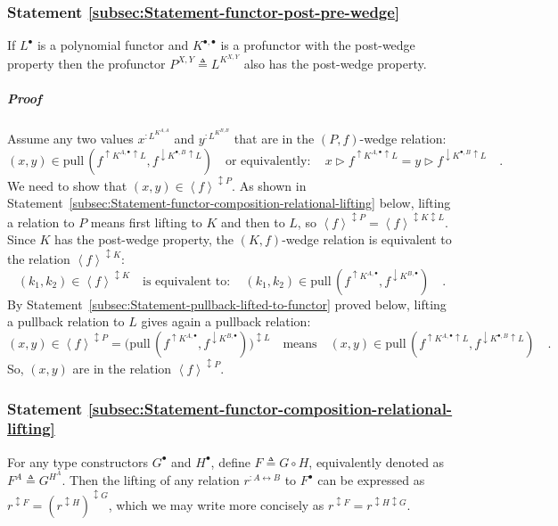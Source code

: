 \subsubsection{Statement \label{subsec:Statement-functor-post-pre-wedge}\ref{subsec:Statement-functor-post-pre-wedge}}

If $L^{\bullet}$ is a polynomial functor and $K^{\bullet,\bullet}$
is a profunctor with the post-wedge property then the profunctor $P^{X,Y}\triangleq L^{K^{X,Y}}$
also has the post-wedge property.

\subparagraph{Proof}

Assume any two values $x^{:L^{K^{A,A}}}$ and $y^{:L^{K^{B,B}}}$
that are in the $\left(P,f\right)$-wedge relation:
\[
(x,y)\in\text{pull}\,(f^{\uparrow K^{A,\bullet}\uparrow L},f^{\downarrow K^{\bullet,B}\uparrow L})\quad\text{or equivalently}:\quad x\triangleright f^{\uparrow K^{A,\bullet}\uparrow L}=y\triangleright f^{\downarrow K^{\bullet,B}\uparrow L}\quad.
\]
We need to show that $\left(x,y\right)\in\left<f\right>^{\updownarrow P}$.
As shown in Statement~\ref{subsec:Statement-functor-composition-relational-lifting}
below, lifting a relation to $P$ means first lifting to $K$ and
then to $L$, so $\left<f\right>^{\updownarrow P}=\left<f\right>^{\updownarrow K\updownarrow L}$.
Since $K$ has the post-wedge property, the $\left(K,f\right)$-wedge
relation is equivalent to the relation $\left<f\right>^{\updownarrow K}$:
\[
(k_{1},k_{2})\in\left<f\right>^{\updownarrow K}\quad\text{is equivalent to}:\quad(k_{1},k_{2})\in\text{pull}\,(f^{\uparrow K^{A,\bullet}},f^{\downarrow K^{B,\bullet}})\quad.
\]
By Statement~\ref{subsec:Statement-pullback-lifted-to-functor} proved
below, lifting a pullback relation to $L$ gives again a pullback
relation:
\[
\left(x,y\right)\in\left<f\right>^{\updownarrow P}=\big(\text{pull}\,(f^{\uparrow K^{A,\bullet}},f^{\downarrow K^{B,\bullet}})\big)^{\updownarrow L}\quad\text{means}\quad(x,y)\in\text{pull}\,(f^{\uparrow K^{A,\bullet}\uparrow L},f^{\downarrow K^{\bullet,B}\uparrow L})\quad.
\]
So, $\left(x,y\right)$ are in the relation $\left<f\right>^{\updownarrow P}$.

\subsubsection{Statement \label{subsec:Statement-functor-composition-relational-lifting}\ref{subsec:Statement-functor-composition-relational-lifting}}

For any type constructors $G^{\bullet}$ and $H^{\bullet}$, define
$F\triangleq G\circ H$, equivalently denoted as $F^{A}\triangleq G^{H^{A}}$.
Then the lifting of any relation $r^{:A\leftrightarrow B}$ to $F^{\bullet}$
can be expressed as $r^{\updownarrow F}=(r^{\updownarrow H})^{\updownarrow G}$,
which we may write more concisely as $r^{\updownarrow F}=r^{\updownarrow H\updownarrow G}$.

